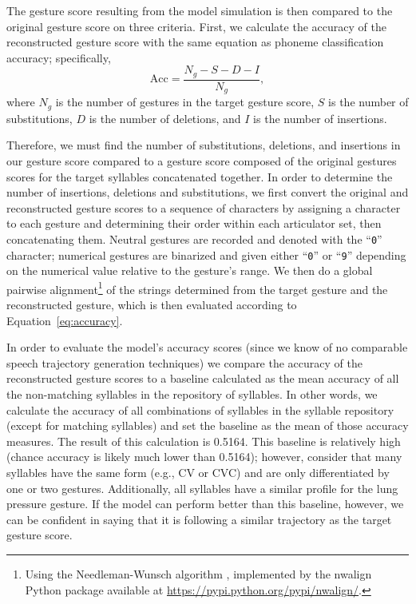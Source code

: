 The gesture score resulting from the model simulation
is then compared to the original gesture score
on three criteria.
First, we calculate the accuracy
of the reconstructed gesture score
with the same equation as phoneme classification accuracy;
specifically,
\begin{equation} \label{eq:accuracy}
  \text{Acc} = \frac{N_g - S - D - I}{N_g},
\end{equation}
where $N_g$ is the number of gestures
in the target gesture score,
$S$ is the number of substitutions,
$D$ is the number of deletions,
and $I$ is the number of insertions.

Therefore, we must find the number of
substitutions, deletions, and insertions
in our gesture score compared to
a gesture score composed of
the original gestures scores
for the target syllables
concatenated together.
In order to determine the number of
insertions, deletions and substitutions,
we first convert the original
and reconstructed gesture scores
to a sequence of characters
by assigning a character to each gesture
and determining their order
within each articulator set,
then concatenating them.
Neutral gestures are recorded
and denoted with the ``\texttt{0}'' character;
numerical gestures are binarized
and given either ``\texttt{0}'' or ``\texttt{9}''
depending on the numerical value
relative to the gesture's range.
We then do a global pairwise alignment\footnote{
  Using the Needleman-Wunsch algorithm \citep{needleman1970},
  implemented by the nwalign Python package
  available at
  \url{https://pypi.python.org/pypi/nwalign/}.}
of the strings determined
from the target gesture
and the reconstructed gesture,
which is then evaluated
according to Equation~\eqref{eq:accuracy}.

In order to evaluate
the model's accuracy scores
(since we know of no comparable
speech trajectory generation techniques)
we compare the accuracy
of the reconstructed gesture scores
to a baseline calculated as
the mean accuracy of all the
non-matching syllables in the
repository of syllables.
In other words, we calculate
the accuracy of all combinations
of syllables in the syllable repository
(except for matching syllables)
and set the baseline as the mean
of those accuracy measures.
The result of this calculation is 0.5164.
This baseline is relatively high
(chance accuracy is likely much lower than 0.5164);
however, consider that many syllables
have the same form (e.g., CV or CVC)
and are only differentiated by
one or two gestures.
Additionally, all syllables
have a similar profile for
the lung pressure gesture.
If the model can perform better
than this baseline, however,
we can be confident
in saying that it is
following a similar trajectory
as the target gesture score.

